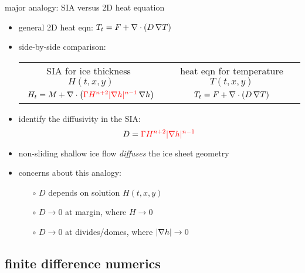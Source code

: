 \begin{frame}{major analogy: SIA versus 2D heat equation}

\begin{itemize}
\item general 2D heat eqn: \quad $T_t = F + \nabla\cdot (D\, \nabla T)$
\item side-by-side comparison:

\medskip
\begin{tabular}{cc}
\scriptsize SIA for ice thickness \, $H(t,x,y)$ & \scriptsize heat eqn for temperature $T(t,x,y)$ \normalsize \medskip \\
	\hspace{-6mm} $H_t = M + \nabla\cdot \left({\color{red}\Gamma H^{n+2} |\nabla h|^{n-1}}\, \nabla h \right)$  &  $T_t = F + \nabla\cdot (D\, \nabla T)$
\end{tabular} 

\medskip
\item identify the diffusivity in the SIA:
	$$D = {\color{red}\Gamma H^{n+2} |\nabla h|^{n-1}}$$
\item non-sliding shallow ice flow \emph{diffuses} the ice sheet geometry
\item concerns about this analogy:
  \begin{itemize}
  \item[$\circ$]  $D$ depends on solution $H(t,x,y)$
  \item[$\circ$]  $D\to 0$ at margin, where $H\to 0$
  \item[$\circ$]  $D\to 0$ at divides/domes, where $|\nabla h|\to 0$
  \end{itemize}
\end{itemize}
\end{frame}


\subsection{finite difference numerics}


